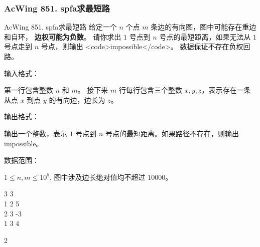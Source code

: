\subsubsection{AcWing 851. spfa求最短路}

\begin{titledbox}{AcWing 851. spfa求最短路}
    给定一个 $n$ 个点 $m$ 条边的有向图，图中可能存在重边和自环， \textbf{边权可能为负数}。 请你求出 $1$ 号点到 $n$ 号点的最短距离，如果无法从 $1$ 号点走到 $n$ 号点，则输出 <code>impossible</code>。
    数据保证不存在负权回路。

    输入格式：

    第一行包含整数 $n$ 和 $m$。 接下来 $m$ 行每行包含三个整数 $x,y,z$，表示存在一条从点 $x$ 到点 $y$ 的有向边，边长为 $z$。

    输出格式：

    输出一个整数，表示 $1$ 号点到 $n$ 号点的最短距离。如果路径不存在，则输出 impossible。

    数据范围：

    $1 \le n,m \le 10^5$, 图中涉及边长绝对值均不超过 $10000$。

    \begin{inputblock}
        3 3 \\
        1 2 5 \\
        2 3 -3 \\
        1 3 4
    \end{inputblock}
    \begin{outputblock}
        2
    \end{outputblock}
\end{titledbox}

